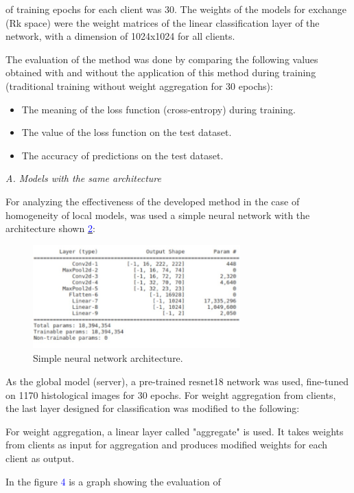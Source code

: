 \documentclass[twotcolumn]{scndocument}
\begin{document}
\begin{multicols}{2}
of training epochs for each client was 30.
The weights of the models for exchange (Rk space)
were the weight matrices of the linear classification layer
of the network, with a dimension of 1024x1024 for all
clients.
\par The evaluation of the method was done by comparing
the following values obtained with and without the
application of this method during training (traditional
training without weight aggregation for 30 epochs): \begin{itemize}
\item The meaning of the loss function (cross-entropy)
during training.
\item The value of the loss function on the test dataset.
\item The accuracy of predictions on the test dataset. \end{itemize} \columnbreak
 \textit{ A. Models with the same architecture} \vspace{1mm}
\par For analyzing the effectiveness of the developed
method in the case of homogeneity of local models, was
used a simple neural network with the architecture shown
\href{https://proc.ostis.net/proc/Proceedings%20OSTIS-2024.pdf}{\textcolor{blue}{2}}: \par
\begin{figure}[H]
  \centering
    \includegraphics[width=8cm,height=4cm]{image.png}
  \caption{Simple neural network architecture.}
\end{figure}
\par As the global model (server), a pre-trained resnet18
network was used, fine-tuned on 1170 histological images
for 30 epochs. For weight aggregation from clients, the
last layer designed for classification was modified to the
following:
\par For weight aggregation, a linear layer called "aggregate" is used. It takes weights from clients as input
for aggregation and produces modified weights for each
client as output.
\par In the figure \textcolor{blue}{4} is a graph showing the evaluation of

\end{multicols}
\end{document}
